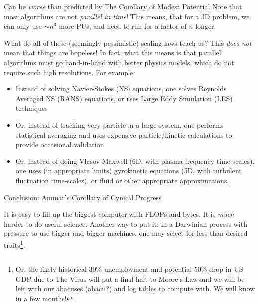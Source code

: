 \documentclass[aspectratio=169]{beamer}
\newcommand{\mypause}{\pause}
\begin{document}
\begin{frame}{Can be \emph{worse} than predicted by The
    Corollary of Modest Potential}
  Note that most algorithms are not \emph{parallel in time}! This
  means, that for a 3D problem, we can only use $\sim n^3$ more PUs,
  and need to run for a factor of $n$ longer.
\end{frame}

\begin{frame}{What do all of these (seemingly pessimistic) scaling
    laws teach us?}
  This \emph{does not} mean that things are hopeless! In fact, what
  this means is that parallel algorithms must go hand-in-hand with
  better physics models, which do not require such high
  resolutions. For example, 
  \begin{itemize}
  \item Instead of solving Navier-Stokes (NS) equations, one solves
    Reynolds Averaged NS (RANS) equations, or uses Large Eddy
    Simulation (LES) techniques%
    \mypause%
  \item Or, instead of tracking very particle in a large system, one
    performs statistical averaging and uses expensive particle/kinetic
    calculations to provide occasional validation
    \mypause%
  \item Or, instead of doing Vlasov-Maxwell (6D, with plasma frequency
    time-scales), one uses (in appropriate limits) gyrokinetic
    equations (5D, with turbulent fluctuation time-scales), or fluid
    or other appropriate approximations.
  \end{itemize}%
\end{frame}

\begin{frame}{Conclusion: Ammar's Corollary of Cynical Progress}

  {\color{blue} It is easy to fill up the biggest computer with FLOPs
    and bytes. It is \emph{much} harder to do useful science.}%
  \vskip0.1in%
  Another way to put it: in a Darwinian process with pressure to use
  bigger-and-bigger machines, one may select for less-than-desired
  traits\footnote{Or, the likely historical 30\% unemployment and
    potential 50\% drop in US GDP due to The Virus will put a final
    halt to Moore's Law and we will be left with our abacuses
    (abacii?) and log tables to compute with. We will know in a few
    months!}.
\end{frame}
\end{document}
